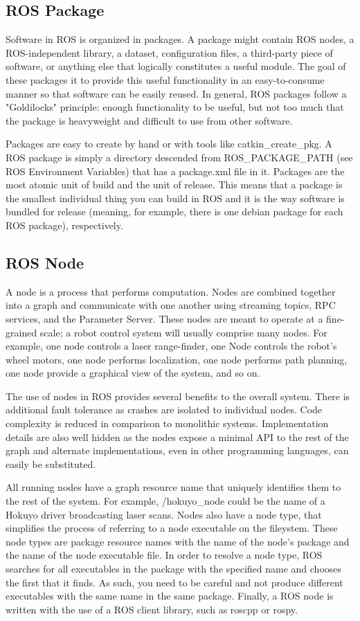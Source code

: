 \subsection{ROS Package}
	Software in ROS is organized in packages. A package might contain ROS nodes, a ROS-independent library, a dataset, configuration files, a third-party piece of software, or anything else that logically constitutes a useful module. The goal of these packages it to provide this useful functionality in an easy-to-consume manner so that software can be easily reused. In general, ROS packages follow a "Goldilocks" principle: enough functionality to be useful, but not too much that the package is heavyweight and difficult to use from other software.
	
	Packages are easy to create by hand or with tools like catkin\_create\_pkg. A ROS package is simply a directory descended from ROS\_PACKAGE\_PATH (see ROS Environment Variables) that has a package.xml file in it. Packages are the most atomic unit of build and the unit of release. This means that a package is the smallest individual thing you can build in ROS and it is the way software is bundled for release (meaning, for example, there is one debian package for each ROS package), respectively.
	
\subsection{ROS Node}
	
	A node is a process that performs computation. Nodes are combined together into a graph and communicate with one another using streaming topics, RPC services, and the Parameter Server. These nodes are meant to operate at a fine-grained scale; a robot control system will usually comprise many nodes. For example, one node controls a laser range-finder, one Node controls the robot's wheel motors, one node performs localization, one node performs path planning, one node provide a graphical view of the system, and so on.
	
	The use of nodes in ROS provides several benefits to the overall system. There is additional fault tolerance as crashes are isolated to individual nodes. Code complexity is reduced in comparison to monolithic systems. Implementation details are also well hidden as the nodes expose a minimal API to the rest of the graph and alternate implementations, even in other programming languages, can easily be substituted.
	
	All running nodes have a graph resource name that uniquely identifies them to the rest of the system. For example, /hokuyo\_node could be the name of a Hokuyo driver broadcasting laser scans. Nodes also have a node type, that simplifies the process of referring to a node executable on the fileystem. These node types are package resource names with the name of the node's package and the name of the node executable file. In order to resolve a node type, ROS searches for all executables in the package with the specified name and chooses the first that it finds. As such, you need to be careful and not produce different executables with the same name in the same package. Finally, a ROS node is written with the use of a ROS client library, such as roscpp or rospy.
	
